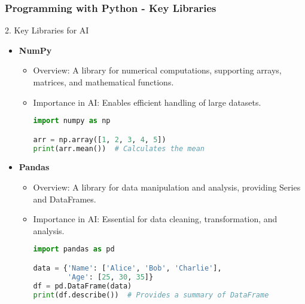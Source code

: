 \documentclass{beamer}
\begin{document}
\begin{frame}[fragile]
    \frametitle{Programming with Python - Key Libraries}
    \begin{block}{2. Key Libraries for AI}
        \begin{itemize}
            \item \textbf{NumPy}
            \begin{itemize}
                \item Overview: A library for numerical computations, supporting arrays, matrices, and mathematical functions.
                \item Importance in AI: Enables efficient handling of large datasets.
                \begin{lstlisting}[language=Python]
import numpy as np

arr = np.array([1, 2, 3, 4, 5])
print(arr.mean())  # Calculates the mean
                \end{lstlisting}
            \end{itemize}

            \item \textbf{Pandas}
            \begin{itemize}
                \item Overview: A library for data manipulation and analysis, providing Series and DataFrames.
                \item Importance in AI: Essential for data cleaning, transformation, and analysis.
                \begin{lstlisting}[language=Python]
import pandas as pd

data = {'Name': ['Alice', 'Bob', 'Charlie'],
        'Age': [25, 30, 35]}
df = pd.DataFrame(data)
print(df.describe())  # Provides a summary of DataFrame
                \end{lstlisting}
            \end{itemize}
        \end{itemize}
    \end{block}
\end{frame}
\end{document}
